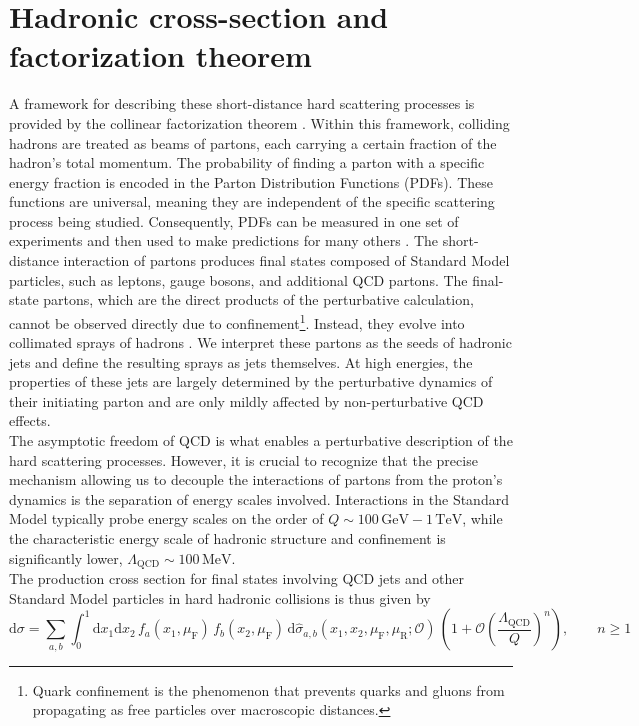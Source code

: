 \documentclass[a4paper, 12pt]{book}
\begin{document}
\section{Hadronic cross-section and factorization theorem}
A framework for describing these short-distance hard scattering processes is provided by the collinear factorization theorem \cite{Collins:1987pm}. Within this framework, colliding hadrons are treated as beams of partons, each carrying a certain fraction of the hadron's total momentum. The probability of finding a parton with a specific energy fraction is encoded in the Parton Distribution Functions (PDFs). These functions are universal, meaning they are independent of the specific scattering process being studied. Consequently, PDFs can be measured in one set of experiments and then used to make predictions for many others \cite{Melnikov2018}. The short-distance interaction of partons produces final states composed of Standard Model particles, such as leptons, gauge bosons, and additional QCD partons. The final-state partons, which are the direct products of the perturbative calculation, cannot be observed directly due to confinement\footnote{Quark confinement is the phenomenon that prevents quarks and gluons from propagating as free particles over macroscopic distances.}. Instead, they evolve into collimated sprays of hadrons \cite{Salam:2010nqg}. We interpret these partons as the seeds of hadronic jets and define the resulting sprays as jets themselves. At high energies, the properties of these jets are largely determined by the perturbative dynamics of their initiating parton and are only mildly affected by non-perturbative QCD effects. \\
The asymptotic freedom of QCD is what enables a perturbative description of the hard scattering processes. However, it is crucial to recognize that the precise mechanism allowing us to decouple the interactions of partons from the proton's dynamics is the separation of energy scales involved. Interactions in the Standard Model typically probe energy scales on the order of $Q \sim 100  \, \text{GeV} - 1 \, \text{TeV}$, while the characteristic energy scale of hadronic structure and confinement is significantly lower, $\Lambda_{\text{QCD}} \sim 100 \, \text{MeV}$. \\
The production cross section for final states involving QCD jets and other Standard Model particles in hard hadronic collisions is thus given by
\begin{equation}
    \text{d}\sigma = \sum_{a, b} \int_0^1 \text{d}x_1 \text{d}x_2 \, f_{a}(x_1, \mu_\text{F}) \, f_{b}(x_2,\mu_\text{F}) \, \text{d}\hat \sigma_{a,b}(x_1,x_2,\mu_\text{F},\mu_\text{R};\mathcal{O}) \, \left(1+ \mathcal{O}\left(\frac{\Lambda_{\text{QCD}}}{Q} \right)^n \right), \qquad n\geq1
    \label{fact-theor}
\end{equation}
\end{document}

